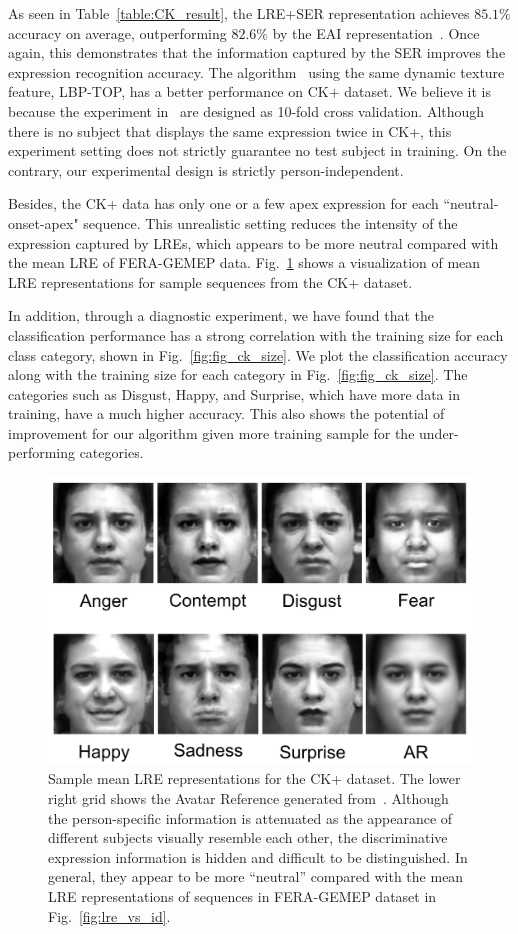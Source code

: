 \documentclass[journal]{IEEEtran}
\begin{document}
As seen in Table~\ref{table:CK_result}, the LRE+SER representation achieves $85.1\%$ accuracy on average, outperforming $82.6\%$ by the EAI representation~\cite{Yang_SMCB12}. Once again, this demonstrates that the information captured by the SER improves the expression recognition accuracy. The algorithm~\cite{Zhao_PAMI07} using the same dynamic texture feature, LBP-TOP, has a better performance on CK+ dataset. We believe it is because the experiment in~\cite{Zhao_PAMI07} are designed as 10-fold cross validation. Although there is no subject that displays the same expression twice in CK+, this experiment setting does not strictly guarantee no test subject in training. On the contrary, our experimental design is strictly person-independent.

Besides, the CK+ data has only one or a few apex expression for each ``neutral-onset-apex" sequence. This unrealistic setting reduces the intensity of the expression captured by LREs, which appears to be more neutral compared with the mean LRE of FERA-GEMEP data. Fig.~\ref{fig:ck_eai} shows a visualization of mean LRE representations for sample sequences from the CK+ dataset. 

In addition, through a diagnostic experiment, we have found that the classification performance has a strong correlation with the training size for each class category, shown in Fig.~\ref{fig:fig_ck_size}. We plot the classification accuracy along with the training size for each category in Fig.~\ref{fig:fig_ck_size}. The categories such as Disgust, Happy, and Surprise, which have more data in training, have a much higher accuracy. This also shows the potential of improvement for our algorithm given more training sample for the under-performing categories. 

\begin{figure}[htbp]
	\centering
		\includegraphics[width=.7\columnwidth]{pics/ck_eai.png}
	\caption{Sample mean LRE representations for the CK+ dataset. The lower right grid shows the Avatar Reference generated from~\cite{Yang_SMCB12}. Although the person-specific information is attenuated as the appearance of different subjects visually resemble each other, the discriminative expression information is hidden and difficult to be distinguished. In general, they appear to be more ``neutral'' compared with the mean LRE representations of sequences in FERA-GEMEP dataset in Fig.~\ref{fig:lre_vs_id}.}
	\label{fig:ck_eai}
\end{figure}
\end{document}
